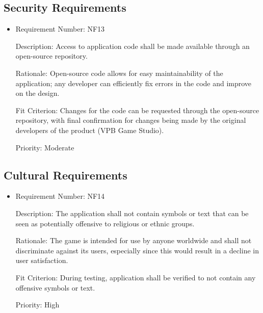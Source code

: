 \documentclass[12pt, titlepage]{article}
\begin{document}
\subsection{Security Requirements}
\begin{itemize}
	\item
	Requirement Number: NF13

	Description: Access to application code shall be made available through an open-source repository.

	Rationale: Open-source code allows for easy maintainability of the application; any developer can efficiently fix errors in the code and improve on the design.

	Fit Criterion: Changes for the code can be requested through the open-source repository, with final confirmation for changes being made by the original developers of the product (VPB Game Studio).

	Priority: Moderate
\end{itemize}

\subsection{Cultural Requirements}
\begin{itemize}
	\item
	Requirement Number: NF14

	Description: The application shall not contain symbols or text that can be seen as potentially offensive to religious or ethnic groups.

	Rationale: The game is intended for use by anyone worldwide and shall not discriminate against its users, especially since this would result in a decline in user satisfaction.

	Fit Criterion: During testing, application shall be verified to not contain any offensive symbols or text.

	Priority: High
\end{itemize}
\end{document}
